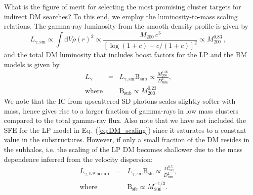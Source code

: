\documentclass[10pt,aps,pra,reprint,amsmath,amsfonts,amssymb,showpacs,nofootinbib,floatfix]{revtex4-1}
\newcommand{\rmn}{\mathrm}
\newcommand{\sub}{\rmn{sub}}
\newcommand{\B}{\rmn{B}}
\newcommand{\sm}{\rmn{sm}}
\newcommand{\dd}{\rmn{d}}
\newcommand{\mvir}{M_{200}}
\begin{document}
What is the figure of merit for selecting the most promising cluster
targets for indirect DM searches? To this end, we employ the
luminosity-to-mass scaling relations. The gamma-ray luminosity from
the smooth density profile is given by \cite{2009PhRvL.103r1302P}
\begin{equation}
L_{\gamma,\sm} \propto \int \dd V \rho(r)^2 \propto \frac{M_{200}\,c^3}
{\left[\log\left(1+c\right)-c/(1+c)\right]^2} \propto \mvir^{0.83}\,,
\end{equation}
and the total DM luminosity that includes boost factors for the LP and
the BM models is given by
\begin{eqnarray}
\label{eq:DM_scaling}
L_{\gamma} &=& L_{\gamma,\rmn{sm}} \B_\rmn{sub} \propto \frac{\mvir^{1.06}}{D_\rmn{lum}^2},\\
\rmn{where} & &\B_\sub \propto \mvir^{0.23}\,.
\end{eqnarray}
We note that the IC from upscattered SD photons scales slightly softer
with mass, hence gives rise to a larger fraction of gamma-rays in low
mass clusters compared to the total gamma-ray flux. Also note that we
have not included the SFE for the LP model in
Eq.~(\ref{eq:DM_scaling}) since it saturates to a constant value in
the substructures. However, if only a small fraction of the DM resides
in the subhalos, i.e. the scaling of the LP DM becomes shallower due
to the mass dependence inferred from the velocity dispersion:
\begin{eqnarray}
L_{\gamma,\rmn{LP~nosub}} &=& L_{\gamma,\rmn{sm}} \B_\rmn{sfe} 
\propto \frac{\mvir^{0.5}}{D_\rmn{lum}^2},\\
\rmn{where} &\quad&\B_\rmn{sfe} \propto \mvir^{-1/3}.
\end{eqnarray}
\end{document}

